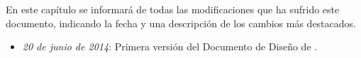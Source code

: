 En este capítulo se informará de todas las modificaciones que ha sufrido este documento, indicando la fecha y una descripción de los cambios más destacados.

\begin{itemize}
	\item \emph{20 de junio de 2014}: Primera versión del Documento de Diseño de \nombrejuego.
\end{itemize}